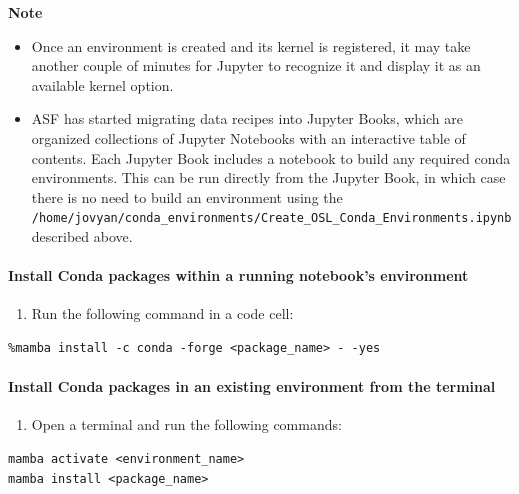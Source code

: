 \begin{framed}
\textbf{Note}\\
\begin{itemize}
\item Once an environment is created and its kernel is registered, it may take another couple of minutes for Jupyter to recognize it and display it as an available kernel option.
\item ASF has started migrating data recipes into Jupyter Books, which are organized collections of Jupyter Notebooks with an interactive table of contents. Each Jupyter Book includes a notebook to build any required conda environments. This can be run directly from the Jupyter Book, in which case there is no need to build an environment using the \texttt{/home/jovyan/conda\_environments/Create\_OSL\_Conda\_Environments.ipynb} described above.
\end{itemize}
\end{framed}

\paragraph{Install Conda packages within a running notebook's environment}\label{Install-Conda-packages-within-a-running-notebooks-environment}

\begin{enumerate}
\item Run the following command in a code cell:
\end{enumerate}

\begin{verbatim}
%mamba install -c conda -forge <package_name> - -yes
\end{verbatim}

\paragraph{Install Conda packages in an existing environment from the terminal}\label{Install-Conda-packages-in-an-existing-environment-from-the-terminal}

\begin{enumerate}
\item Open a terminal and run the following commands:
\end{enumerate}

\begin{verbatim}
mamba activate <environment_name>
mamba install <package_name>
\end{verbatim}

